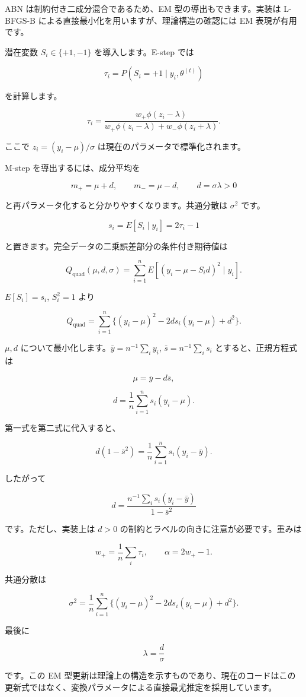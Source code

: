 \documentclass[
]{article}
\begin{document}
ABN は制約付き二成分混合であるため、EM 型の導出もできます。実装は
L-BFGS-B による直接最小化を用いますが、理論構造の確認には EM
表現が有用です。

潜在変数 \(S_i\in\{+1,-1\}\) を導入します。E-step では

\[
\tau_i=P(S_i=+1\mid y_i,\theta^{(t)})
\]

を計算します。

\[
\tau_i
=\frac{w_+\phi(z_i-\lambda)}{w_+\phi(z_i-\lambda)+w_-\phi(z_i+\lambda)}.
\]

ここで \(z_i=(y_i-\mu)/\sigma\) は現在のパラメータで標準化されます。

M-step を導出するには、成分平均を

\[
m_+=\mu+d,
\qquad
m_- =\mu-d,
\qquad
 d=\sigma\lambda>0
\]

と再パラメータ化すると分かりやすくなります。共通分散は \(\sigma^2\)
です。

\[
s_i=E[S_i\mid y_i]=2\tau_i-1
\]

と置きます。完全データの二乗誤差部分の条件付き期待値は

\[
Q_{\mathrm{quad}}(\mu,d,\sigma)
=\sum_{i=1}^{n}E[(y_i-\mu-S_i d)^2\mid y_i].
\]

\(E[S_i]=s_i\), \(S_i^2=1\) より

\[
Q_{\mathrm{quad}}
=\sum_{i=1}^{n}\{(y_i-\mu)^2-2d s_i(y_i-\mu)+d^2\}.
\]

\(\mu,d\) について最小化します。\(\bar y=n^{-1}\sum_i y_i\),
\(\bar s=n^{-1}\sum_i s_i\) とすると、正規方程式は

\[
\mu=\bar y-d\bar s,
\]

\[
d=\frac{1}{n}\sum_{i=1}^{n}s_i(y_i-\mu).
\]

第一式を第二式に代入すると、

\[
d(1-\bar s^2)=\frac{1}{n}\sum_{i=1}^{n}s_i(y_i-\bar y).
\]

したがって

\[
d=\frac{n^{-1}\sum_i s_i(y_i-\bar y)}{1-\bar s^2}
\]

です。ただし、実装上は \(d>0\)
の制約とラベルの向きに注意が必要です。重みは

\[
w_+ = \frac{1}{n}\sum_i\tau_i,
\qquad
\alpha=2w_+-1.
\]

共通分散は

\[
\sigma^2
=\frac{1}{n}\sum_{i=1}^{n}\{(y_i-\mu)^2-2d s_i(y_i-\mu)+d^2\}.
\]

最後に

\[
\lambda=\frac{d}{\sigma}
\]

です。この EM
型更新は理論上の構造を示すものであり、現在のコードはこの更新式ではなく、変換パラメータによる直接最尤推定を採用しています。
\end{document}
